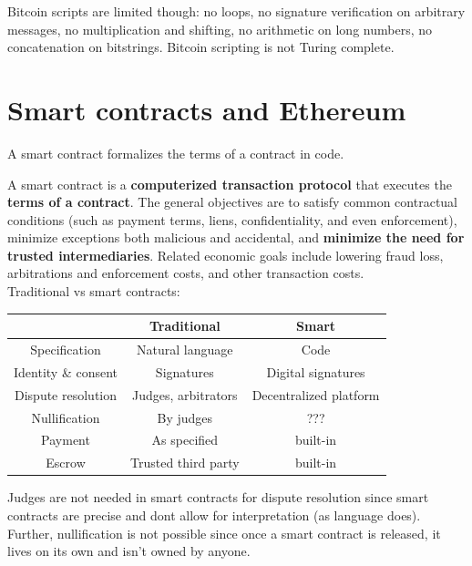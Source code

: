\documentclass[11pt,oneside,a4paper]{article}
\begin{document}
Bitcoin scripts are limited though: no loops, no signature verification on arbitrary messages, no multiplication and shifting, no arithmetic on long numbers, no concatenation on bitstrings. Bitcoin scripting is not Turing complete.


\section{Smart contracts and Ethereum}

\begin{center}
	A smart contract formalizes the terms of a contract in code.
\end{center}

A smart contract is a \textbf{computerized transaction protocol} that executes the \textbf{terms of a contract}. The general objectives are to satisfy common contractual conditions (such as payment terms, liens, confidentiality, and even enforcement), minimize exceptions both malicious and accidental, and \textbf{minimize the need for trusted intermediaries}. Related economic goals include lowering fraud loss, arbitrations and enforcement costs, and other transaction costs.\\
Traditional vs smart contracts:

\begin{center}
	\begin{tabular}{|c|c|c|}
		\hline
		& Traditional & Smart \\
		\hline
		Specification & Natural language & Code \\
		\hline
		Identity \& consent & Signatures & Digital signatures \\
		\hline
		Dispute resolution & Judges, arbitrators & Decentralized platform \\
		\hline
		Nullification & By judges & ??? \\
		\hline
		Payment & As specified & built-in \\
		\hline
		Escrow & Trusted third party & built-in \\
		\hline
	\end{tabular}
\end{center}

Judges are not needed in smart contracts for dispute resolution since smart contracts are precise and dont allow for interpretation (as language does). Further, nullification is not possible since once a smart contract is released, it lives on its own and isn't owned by anyone.

\newpage
\end{document}
